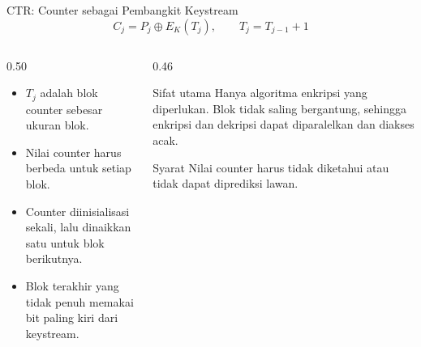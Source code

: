 \documentclass[aspectratio=169,11pt]{beamer}
\begin{document}
\begin{frame}{CTR: Counter sebagai Pembangkit Keystream}
    \footnotesize
    \[
        C_j = P_j \oplus E_K(T_j), \qquad T_j = T_{j-1}+1
    \]
    \begin{columns}[T,onlytextwidth]
        \begin{column}{0.50\textwidth}
            \begin{itemize}
                \item $T_j$ adalah blok counter sebesar ukuran blok.
                \item Nilai counter harus berbeda untuk setiap blok.
                \item Counter diinisialisasi sekali, lalu dinaikkan satu
                      untuk blok berikutnya.
                \item Blok terakhir yang tidak penuh memakai bit paling
                      kiri dari keystream.
            \end{itemize}
        \end{column}
        \begin{column}{0.46\textwidth}
            \begin{exampleblock}{Sifat utama}
                \footnotesize
                Hanya algoritma enkripsi yang diperlukan. Blok tidak
                saling bergantung, sehingga enkripsi dan dekripsi dapat
                diparalelkan dan diakses acak.
            \end{exampleblock}
            \begin{alertblock}{Syarat}
                \footnotesize
                Nilai counter harus tidak diketahui atau tidak dapat
                diprediksi lawan.
            \end{alertblock}
        \end{column}
    \end{columns}
\end{frame}
\end{document}
